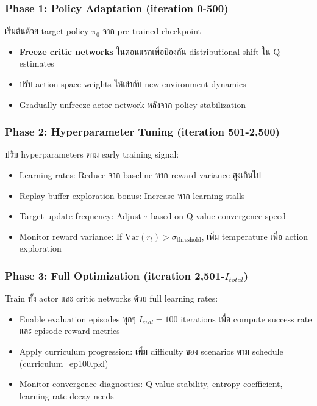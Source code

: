\documentclass[10pt,a4paper,twocolumn]{article}
\begin{document}
\subsubsection{Phase 1: Policy Adaptation (iteration 0-500)}
เริ่มต้นด้วย target policy $\pi_0$ จาก pre-trained checkpoint
\begin{itemize}
    \item \textbf{Freeze critic networks} ในตอนแรกเพื่อป้องกัน distributional shift ใน Q-estimates
    \item ปรับ action space weights ให้เข้ากับ new environment dynamics
    \item Gradually unfreeze actor network หลังจาก policy stabilization
\end{itemize}

\subsubsection{Phase 2: Hyperparameter Tuning (iteration 501-2,500)}
ปรับ hyperparameters ตาม early training signal:
\begin{itemize}
    \item Learning rates: Reduce จาก baseline หาก reward variance สูงเกินไป
    \item Replay buffer exploration bonus: Increase หาก learning stalls
    \item Target update frequency: Adjust $\tau$ based on Q-value convergence speed
    \item Monitor reward variance: If $\text{Var}(r_t) > \sigma_{\text{threshold}}$, เพิ่ม temperature เพื่อ action exploration
\end{itemize}

\subsubsection{Phase 3: Full Optimization (iteration 2,501-$I_{total}$)}
Train ทั้ง actor และ critic networks ด้วย full learning rates:
\begin{itemize}
    \item Enable evaluation episodes ทุกๆ $I_{eval}=100$ iterations เพื่อ compute success rate และ episode reward metrics
    \item Apply curriculum progression: เพิ่ม difficulty ของ scenarios ตาม schedule (curriculum_ep100.pkl)
    \item Monitor convergence diagnostics: Q-value stability, entropy coefficient, learning rate decay needs
\end{itemize}
\end{document}
